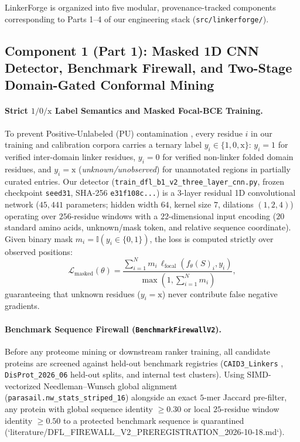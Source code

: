 \documentclass[11pt]{article}
\begin{document}
LinkerForge is organized into five modular, provenance-tracked components corresponding to Parts 1--4 of our engineering stack (\texttt{src/linkerforge/}).

\subsection{Component 1 (Part 1): Masked 1D CNN Detector, Benchmark Firewall, and Two-Stage Domain-Gated Conformal Mining}
\label{sec:method_part1}

\paragraph{Strict $1/0/\text{x}$ Label Semantics and Masked Focal-BCE Training.}
To prevent Positive-Unlabeled (PU) contamination \cite{bekker2020pu}, every residue $i$ in our training and calibration corpora carries a ternary label $y_i \in \{1, 0, \text{x}\}$: $y_i = 1$ for verified inter-domain linker residues, $y_i = 0$ for verified non-linker folded domain residues, and $y_i = \text{x}$ (\emph{unknown/unobserved}) for unannotated regions in partially curated entries. Our detector (\texttt{train\_dfl\_b1\_v2\_three\_layer\_cnn.py}, frozen checkpoint \texttt{seed31}, SHA-256 \texttt{e31f108c...}) is a 3-layer residual 1D convolutional network ($45{,}441$ parameters; hidden width $64$, kernel size $7$, dilations $(1, 2, 4)$) operating over $256$-residue windows with a $22$-dimensional input encoding ($20$ standard amino acids, unknown/mask token, and relative sequence coordinate). Given binary mask $m_i = \mathbb{I}(y_i \in \{0, 1\})$, the loss is computed strictly over observed positions:
\begin{equation}
  \mathcal{L}_{\text{masked}}(\theta) = \frac{\sum_{i=1}^N m_i \, \ell_{\text{focal}}(f_\theta(S)_i, y_i)}{\max\!\left(1, \sum_{i=1}^N m_i\right)},
\end{equation}
guaranteeing that unknown residues ($y_i = \text{x}$) never contribute false negative gradients.

\paragraph{Benchmark Sequence Firewall (\texttt{BenchmarkFirewallV2}).}
Before any proteome mining or downstream ranker training, all candidate proteins are screened against held-out benchmark registries (\texttt{CAID3\_Linkers} \cite{caid3_2025}, \texttt{DisProt\_2026\_06} held-out splits, and internal test clusters). Using SIMD-vectorized Needleman--Wunsch global alignment (\texttt{parasail.nw\_stats\_striped\_16}) alongside an exact $5$-mer Jaccard pre-filter, any protein with global sequence identity $\ge 0.30$ or local $25$-residue window identity $\ge 0.50$ to a protected benchmark sequence is quarantined (`literature/DFL_FIREWALL_V2_PREREGISTRATION_2026-10-18.md`).
\end{document}
